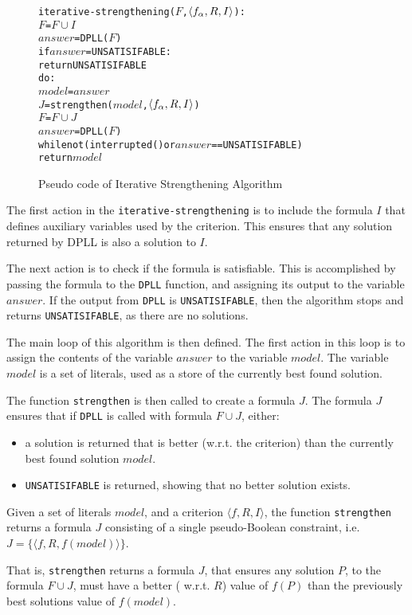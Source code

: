 \begin{figure}[htp]
\begin{center}
\begin{alltt}
iterative-strengthening(\(F\),\(\langle f\sb{\alpha}, R, I \rangle\)):
    \(F\) = \(F \cup I\)
    \(answer\) = DPLL(\(F\))
    if \(answer\) = UNSATISIFABLE:
        return UNSATISIFABLE
    do:
        \(model\) = \(answer\)
        \(J\) = strengthen(\(model\),\(\langle f\sb{\alpha}, R, I \rangle\))
        \(F\) = \(F \cup J\)
        \(answer\) = DPLL(\(F\))
    while not (interrupted() or  \(answer\) == UNSATISIFABLE)
    return \(model\) 
\end{alltt}
  \caption{Pseudo code of Iterative Strengthening Algorithm}
  \label{impl.strength}
\end{center}
\end{figure}

The first action in the \texttt{iterative-strengthening} is to include the formula $I$ that defines auxiliary variables used by the criterion.
This ensures that any solution returned by DPLL is also a solution to $I$.

The next action is to check if the formula is satisfiable.
This is accomplished by passing the formula to the \texttt{DPLL} function, and assigning its output to the variable $answer$.
If the output from \texttt{DPLL} is \texttt{UNSATISIFABLE}, then the algorithm stops and returns \texttt{UNSATISIFABLE}, as there are no solutions.

The main loop of this algorithm is then defined.
The first action in this loop is to assign the contents of the variable $answer$ to the variable $model$.
The variable $model$ is a set of literals, used as a store of the currently best found solution.

The function \texttt{strengthen} is then called to create a formula $J$.
The formula $J$ ensures that if \texttt{DPLL} is called with formula $F \cup J$, either:
\begin{itemize}
  \item a solution is returned that is better (w.r.t. the criterion) than the currently best found solution $model$. 
  \item \texttt{UNSATISIFABLE} is returned, showing that no better solution exists.
\end{itemize}

\begin{defs}
Given a set of literals $model$, and a criterion $\langle f, R, I \rangle$,
the function \texttt{strengthen} returns a formula $J$ consisting of a single pseudo-Boolean constraint, i.e. $ J = \{ \langle f,R,f(model) \rangle \}$.
\end{defs}
That is, \texttt{strengthen} returns a formula $J$,
that ensures any solution $P$, to the formula $F \cup J$, must have a better ( w.r.t. $R$) value of $f(P)$ than the previously best solutions value of $f(model)$.

